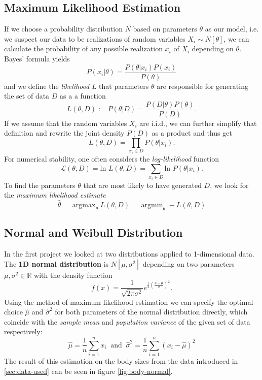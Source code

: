 \documentclass{article}
\DeclareMathOperator*{\argmin}{argmin} %
\DeclareMathOperator*{\argmax}{argmax}
\begin{document}
\subsection{Maximum Likelihood Estimation}
If we choose a probability distribution $N$ based on parameters $\theta$ as our model, i.e. we suspect our data to be realizations of random variables $X_i\sim N[\theta]$, we can calculate the probability of any possible realization $x_i$ of $X_i$ depending on $\theta$. Bayes' formula yields
\[ P(x_i|\theta) = \frac{P(\theta|x_i)P(x_i)}{P(\theta)}\]
and we define the \emph{likelihood} $L$ that parameters $\theta$ are responsible for generating the set of data $D$ as a a function
\[ L(\theta,D) := P(\theta|D) = \frac{P(D|\theta)P(\theta)}{P(D)}. \]
If we assume that the random variables $X_i$ are i.i.d., we can further simplify that definition and rewrite the joint density $P(D)$ as a product and thus get
\[ L(\theta,D) = \prod_{x_i\in D} P(\theta|x_i).\]
For numerical stability, one often considers the \emph{log-likelihood} function
\[ \mathcal{L}(\theta,D) = \text{ln }L(\theta,D) = \sum_{x_i\in D} \text{ln }P(\theta|x_i).\]
To find the parameters $\theta$ that are most likely to have generated $D$, we look for the \emph{maximum likelihood estimate}
\[\hat{\theta} = \argmax_\theta L(\theta, D) = \argmin_\theta - L(\theta,D) \]
\subsection{Normal and Weibull Distribution}
In the first project we looked at two distributions applied to 1-dimensional data.
The \textbf{1D normal distribution} is $N[\mu,\sigma^2]$ depending on two parameters $\mu,\sigma^2\in\mathbb{R}$ with the density function
\[f(x)=\frac{1}{\sqrt{2\pi \sigma^2}} e^{\frac{1}{2}(\frac{x-\mu}{\sigma})^2}.\]
Using the method of maximum likelihood estimation we can specify the optimal choice $\hat{\mu}$ and $\hat{\sigma}^2$ for both parameters of the normal distribution directly, which coincide with the \emph{sample mean} and \emph{population variance} of the given set of data respectively:
\[\hat{\mu} = \frac{1}{n}\sum_{i=1}^n x_i \:\text{ and }\: \hat{\sigma}^2 = \frac{1}{n}\sum_{i=1}^n (x_i - \hat{\mu})^2\]
The result of this estimation on the body sizes from the data introduced in \ref{sec:data-used} can be seen in figure \ref{fig:body-normal}.\\
\end{document}
